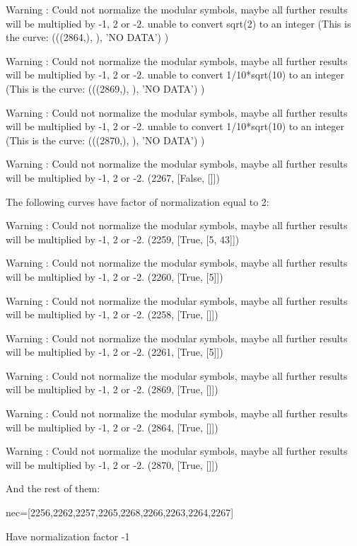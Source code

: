 Warning : Could not normalize the modular symbols, maybe all further results will be multiplied by -1, 2 or -2.
unable to convert sqrt(2) to an integer  (This is the curve:  (((2864,), {}), 'NO DATA') )

Warning : Could not normalize the modular symbols, maybe all further results will be multiplied by -1, 2 or -2.
unable to convert 1/10*sqrt(10) to an integer   (This is the curve:  (((2869,), {}), 'NO DATA') )

Warning : Could not normalize the modular symbols, maybe all further results will be multiplied by -1, 2 or -2.
unable to convert 1/10*sqrt(10) to an integer    (This is the curve:  (((2870,), {}), 'NO DATA') )

Warning : Could not normalize the modular symbols, maybe all further results will be multiplied by -1, 2 or -2.
(2267, [False, []])


The following curves have factor of normalization equal to 2:

Warning : Could not normalize the modular symbols, maybe all further
results will be multiplied by -1, 2 or -2.
(2259, [True, [5, 43]])

Warning : Could not normalize the modular symbols, maybe all further
results will be multiplied by -1, 2 or -2.
(2260, [True, [5]])

Warning : Could not normalize the modular symbols, maybe all further results will be multiplied by -1, 2 or -2.
(2258, [True, []])

Warning : Could not normalize the modular symbols, maybe all further results will be multiplied by -1, 2 or -2.
(2261, [True, [5]])

Warning : Could not normalize the modular symbols, maybe all further results will be multiplied by -1, 2 or -2.
(2869, [True, []])

Warning : Could not normalize the modular symbols, maybe all further results will be multiplied by -1, 2 or -2.
(2864, [True, []])

Warning : Could not normalize the modular symbols, maybe all further results will be multiplied by -1, 2 or -2.
(2870, [True, []])

And the rest of them:

nec=[2256,2262,2257,2265,2268,2266,2263,2264,2267]

Have normalization factor -1

